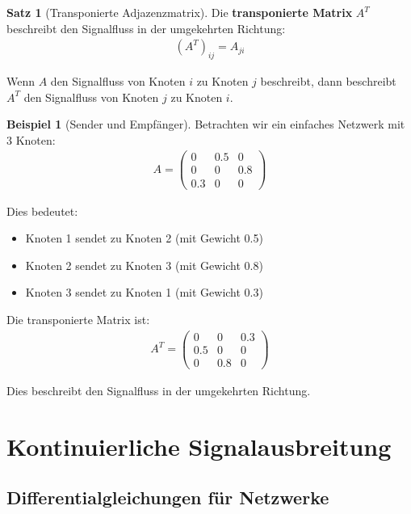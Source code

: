 ﻿\documentclass[a4paper,12pt]{report}
\theoremstyle{definition}
\newtheorem{beispiel}{Beispiel}
\newtheorem{satz}{Satz}
\begin{document}
	\begin{satz}[Transponierte Adjazenzmatrix]
		Die \textbf{transponierte Matrix} $A^T$ beschreibt den Signalfluss in der umgekehrten Richtung:
		\begin{align}
			(A^T)_{ij} = A_{ji}
		\end{align}
		
		Wenn $A$ den Signalfluss von Knoten $i$ zu Knoten $j$ beschreibt, dann beschreibt $A^T$ den Signalfluss von Knoten $j$ zu Knoten $i$.
	\end{satz}
	
	\begin{beispiel}[Sender und Empfänger]
		Betrachten wir ein einfaches Netzwerk mit 3 Knoten:
		\begin{align}
			A = \begin{pmatrix} 0 & 0.5 & 0 \\ 0 & 0 & 0.8 \\ 0.3 & 0 & 0 \end{pmatrix}
		\end{align}
		
		Dies bedeutet:
		\begin{itemize}
			\item[-] Knoten 1 sendet zu Knoten 2 (mit Gewicht 0.5)
			\item[-] Knoten 2 sendet zu Knoten 3 (mit Gewicht 0.8)
			\item[-] Knoten 3 sendet zu Knoten 1 (mit Gewicht 0.3)
		\end{itemize}
		
		Die transponierte Matrix ist:
		\begin{align}
			A^T = \begin{pmatrix} 0 & 0 & 0.3 \\ 0.5 & 0 & 0 \\ 0 & 0.8 & 0 \end{pmatrix}
		\end{align}
		
		Dies beschreibt den Signalfluss in der umgekehrten Richtung.
	\end{beispiel}
	
	\section{Kontinuierliche Signalausbreitung}
	
	\subsection{Differentialgleichungen für Netzwerke}
	
\end{document}
